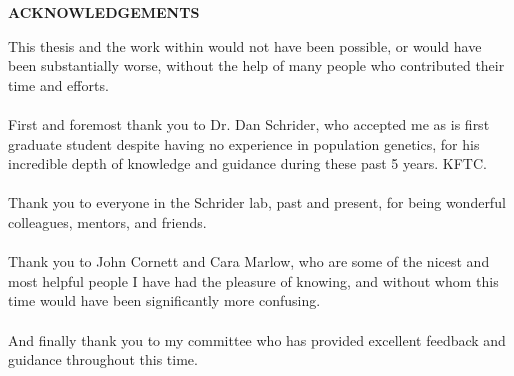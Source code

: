 
\begin{center}
\vspace*{52pt}
{\normalfont \textbf{ACKNOWLEDGEMENTS}}
\end{center}

This thesis and the work within would not have been possible, or would have been substantially worse, without the help of many people who contributed their time and efforts. \\ \\
First and foremost thank you to Dr. Dan Schrider, who accepted me as is first graduate student despite having no experience in population genetics, for his incredible depth of knowledge and guidance during these past 5 years. KFTC. \\ \\
Thank you to everyone in the Schrider lab, past and present, for being wonderful colleagues, mentors, and friends. \\ \\
Thank you to John Cornett and Cara Marlow, who are some of the nicest and most helpful people I have had the pleasure of knowing, and without whom this time would have been significantly more confusing. \\ \\
And finally thank you to my committee who has provided excellent feedback and guidance throughout this time.

\clearpage
